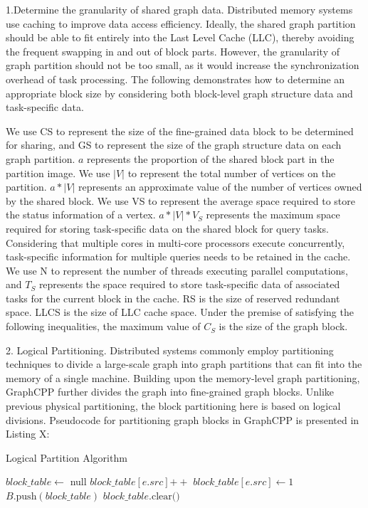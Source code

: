 \documentclass[lettersize,journal]{IEEEtran} %
\begin{document}
1.Determine the granularity of shared graph data. Distributed memory systems use caching to improve data access efficiency. Ideally, the shared graph partition should be able to fit entirely into the Last Level Cache (LLC), thereby avoiding the frequent swapping in and out of block parts. However, the granularity of graph partition should not be too small, as it would increase the synchronization overhead of task processing. The following demonstrates how to determine an appropriate block size by considering both block-level graph structure data and task-specific data.

We use CS to represent the size of the fine-grained data block to be determined for sharing, and GS to represent the size of the graph structure data on each graph partition. $a$ represents the proportion of the shared block part in the partition image. We use $|V|$ to represent the total number of vertices on the partition. $a*|V|$ represents an approximate value of the number of vertices owned by the shared block. We use VS to represent the average space required to store the status information of a vertex. $a*|V|*V_S$ represents the maximum space required for storing task-specific data on the shared block for query tasks. Considering that multiple cores in multi-core processors execute concurrently, task-specific information for multiple queries needs to be retained in the cache. We use N to represent the number of threads executing parallel computations, and $T_S$ represents the space required to store task-specific data of associated tasks for the current block in the cache. RS is the size of reserved redundant space. LLCS is the size of LLC cache space. Under the premise of satisfying the following inequalities, the maximum value of $C_S$ is the size of the graph block.

2. Logical Partitioning. Distributed systems commonly employ partitioning techniques to divide a large-scale graph into graph partitions that can fit into the memory of a single machine. Building upon the memory-level graph partitioning, GraphCPP further divides the graph into fine-grained graph blocks. Unlike previous physical partitioning, the block partitioning here is based on logical divisions. Pseudocode for partitioning graph blocks in GraphCPP is presented in Listing X:

\begin{algorithm}
\caption{Logical Partition Algorithm}
\begin{algorithmic}[1]
 
    \State $block\_table \gets$ null
      
            \State $block\_table[e.src] \mathrel{+{+}}$
        \Else
            \State $block\_table[e.src] \gets 1$
        \EndIf
            \State $B.\text{push}(block\_table)$
            \State $block\_table.\text{clear()}$
        \EndIf
    \EndFor
\EndFunction
\end{algorithmic}
\end{algorithm}
\end{document}
